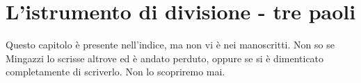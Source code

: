 

\chapter{L'istrumento di divisione - tre paoli}

Questo capitolo è presente nell'indice, ma non vi è nei manoscritti. Non so se Mingazzi lo scrisse altrove ed è andato perduto, oppure se si è dimenticato completamente di scriverlo. Non lo scopriremo mai.

